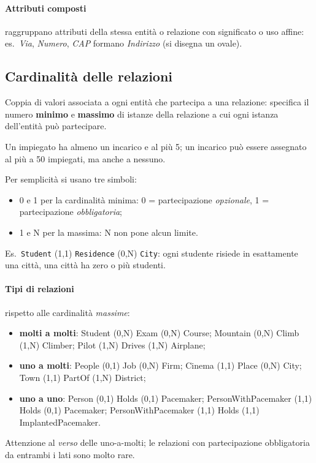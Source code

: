 \documentclass[a4paper,12pt]{article}
\begin{document}
\paragraph{Attributi composti} raggruppano attributi della stessa entità o
relazione con significato o uso affine: es.\ \emph{Via}, \emph{Numero},
\emph{CAP} formano \emph{Indirizzo} (si disegna un ovale).

\subsection{Cardinalità delle relazioni}

Coppia di valori associata a ogni entità che partecipa a una relazione:
specifica il numero \textbf{minimo} e \textbf{massimo} di istanze della
relazione a cui ogni istanza dell'entità può partecipare.
\begin{center}
\end{center}
Un impiegato ha almeno un incarico e al più 5; un incarico può essere
assegnato al più a 50 impiegati, ma anche a nessuno.

Per semplicità si usano tre simboli:
\begin{itemize}
  \item 0 e 1 per la cardinalità minima: 0 = partecipazione
    \emph{opzionale}, 1 = partecipazione \emph{obbligatoria};
  \item 1 e N per la massima: N non pone alcun limite.
\end{itemize}
Es.\ \texttt{Student} (1,1) \texttt{Residence} (0,N) \texttt{City}: ogni
studente risiede in esattamente una città, una città ha zero o più studenti.

\paragraph{Tipi di relazioni} rispetto alle cardinalità \emph{massime}:
\begin{itemize}
  \item \textbf{molti a molti}: Student (0,N) Exam (0,N) Course; Mountain
    (0,N) Climb (1,N) Climber; Pilot (1,N) Drives (1,N) Airplane;
  \item \textbf{uno a molti}: People (0,1) Job (0,N) Firm; Cinema (1,1) Place
    (0,N) City; Town (1,1) PartOf (1,N) District;
  \item \textbf{uno a uno}: Person (0,1) Holds (0,1) Pacemaker;
    PersonWithPacemaker (1,1) Holds (0,1) Pacemaker; PersonWithPacemaker (1,1)
    Holds (1,1) ImplantedPacemaker.
\end{itemize}
Attenzione al \emph{verso} delle uno-a-molti; le relazioni con partecipazione
obbligatoria da entrambi i lati sono molto rare.
\end{document}
